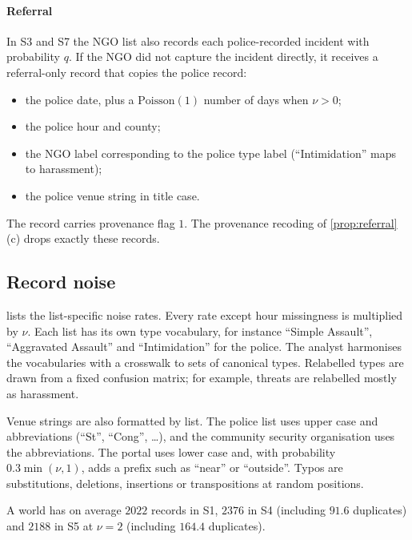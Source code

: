 \paragraph{Referral} In S3 and S7 the NGO list also records each police-recorded incident with probability $q$. If the NGO did not capture the incident directly, it receives a referral-only record that copies the police record:
\begin{itemize}
  \item the police date, plus a $\mathrm{Poisson}(1)$ number of days when $\nu>0$;
  \item the police hour and county;
  \item the NGO label corresponding to the police type label (``Intimidation'' maps to harassment);
  \item the police venue string in title case.
\end{itemize}
The record carries provenance flag $1$. The provenance recoding of \cref{prop:referral}(c) drops exactly these records.

\subsection{Record noise}\label{app:sim-noise}

 lists the list-specific noise rates. Every rate except hour missingness is multiplied by $\nu$. Each list has its own type vocabulary, for instance ``Simple Assault'', ``Aggravated Assault'' and ``Intimidation'' for the police. The analyst harmonises the vocabularies with a crosswalk to sets of canonical types. Relabelled types are drawn from a fixed confusion matrix; for example, threats are relabelled mostly as harassment.

Venue strings are also formatted by list. The police list uses upper case and abbreviations (``St'', ``Cong'', \dots), and the community security organisation uses the abbreviations. The portal uses lower case and, with probability $0.3\min(\nu,1)$, adds a prefix such as ``near'' or ``outside''. Typos are substitutions, deletions, insertions or transpositions at random positions.

A world has on average $2022$ records in S1, $2376$ in S4 (including $91.6$ duplicates) and $2188$ in S5 at $\nu=2$ (including $164.4$ duplicates).

